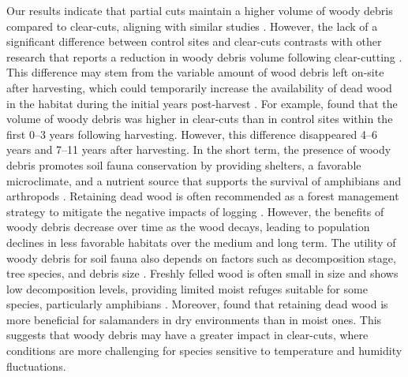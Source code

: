 Our results indicate that partial cuts maintain a higher volume of woody debris compared to clear-cuts, aligning with similar studies \citep{Nolet2018Comparingeffects,Ochs2022Responseterrestrial}.  
However, the lack of a significant difference between control sites and clear-cuts contrasts with other research that reports a reduction in woody debris volume following clear-cutting \citep{Mazerolle2021Woodlandsalamander}.  
This difference may stem from the variable amount of wood debris left on-site after harvesting, which could temporarily increase the availability of dead wood in the habitat during the initial years post-harvest \citep{McCarthy1994Distributionabundance}.  
For example, \cite{Ochs2022Responseterrestrial} found that the volume of woody debris was higher in clear-cuts than in control sites within the first 0–3 years following harvesting. 
However, this difference disappeared 4–6 years and 7–11 years after harvesting.  
In the short term, the presence of woody debris promotes soil fauna conservation by providing shelters, a favorable microclimate, and a nutrient source that supports the survival of amphibians and arthropods \citep{spotilaRoleTemperatureWater1972,Huhta1976Effectsclearcutting,Seibold2021contributioninsects,Ochs2022Responseterrestrial}.  
Retaining dead wood is often recommended as a forest management strategy to mitigate the negative impacts of logging \citep{McKenny2006Effectsstructural}.  
However, the benefits of woody debris decrease over time as the wood decays, leading to population declines in less favorable habitats over the medium and long term.  
The utility of woody debris for soil fauna also depends on factors such as decomposition stage, tree species, and debris size \citep{Bunnell2010woodbiodiversity}.  
Freshly felled wood is often small in size and shows low decomposition levels, providing limited moist refuges suitable for some species, particularly amphibians \citep{Petranka1994Effectstimber,Morneault2004effectshelterwood,Owens2008Amphibianreptile,Otto2013Amphibianresponse}.  
Moreover, \cite{Petranka1994Effectstimber} found that retaining dead wood is more beneficial for salamanders in dry environments than in moist ones.  
This suggests that woody debris may have a greater impact in clear-cuts, where conditions are more challenging for species sensitive to temperature and humidity fluctuations.



